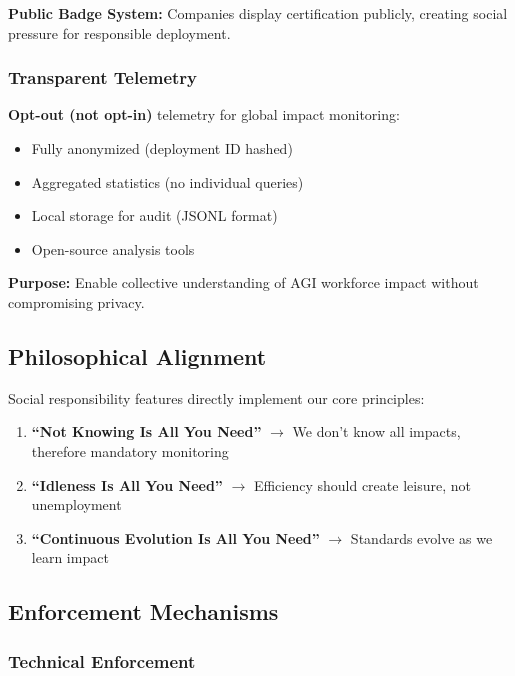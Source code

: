 \documentclass[11pt]{article}
\begin{document}
\textbf{Public Badge System:} Companies display certification publicly, creating social pressure for responsible deployment.

\subsubsection{Transparent Telemetry}

\textbf{Opt-out (not opt-in)} telemetry for global impact monitoring:

\begin{itemize}
    \item Fully anonymized (deployment ID hashed)
    \item Aggregated statistics (no individual queries)
    \item Local storage for audit (JSONL format)
    \item Open-source analysis tools
\end{itemize}

\textbf{Purpose:} Enable collective understanding of AGI workforce impact without compromising privacy.

\subsection{Philosophical Alignment}

Social responsibility features directly implement our core principles:

\begin{enumerate}
    \item \textbf{``Not Knowing Is All You Need''} $\rightarrow$ We don't know all impacts, therefore mandatory monitoring
    \item \textbf{``Idleness Is All You Need''} $\rightarrow$ Efficiency should create leisure, not unemployment
    \item \textbf{``Continuous Evolution Is All You Need''} $\rightarrow$ Standards evolve as we learn impact
\end{enumerate}

\subsection{Enforcement Mechanisms}

\subsubsection{Technical Enforcement}
\end{document}
